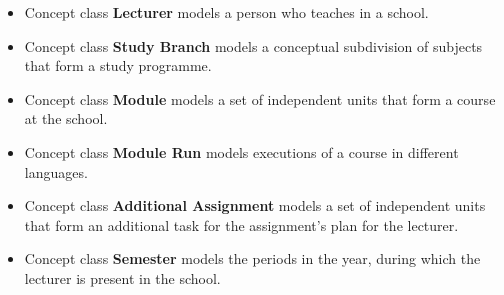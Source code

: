 \documentclass{scrartcl}
\begin{document}
	    \begin{itemize}
	    \item Concept class \textbf{Lecturer} models a person who teaches in a school.
	     \item Concept class \textbf{Study Branch} models a conceptual subdivision of subjects that form a study programme.
	      \item Concept class \textbf{Module} models a set of independent units that form a course at the school.
	       \item Concept class \textbf{Module Run } models executions of a course in different languages.
	       	      \item Concept class \textbf{Additional Assignment} models a set of independent units that form an additional task for the assignment's plan for the lecturer.
  \item Concept class \textbf{Semester} models the periods in the year, during which the lecturer is present in the school.
	         
	    \end{itemize}


	      
	    
\end{document}
